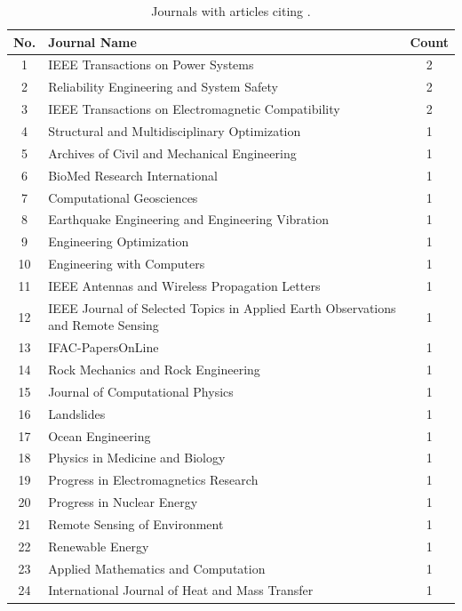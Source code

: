 \documentclass[11pt]{article}
\begin{document}
\begin{table}[!ht]
  \centering
  \caption{Journals with articles citing \uqlab.}
  \label{tab:citing_journals} 
  \begin{tabularx}{\textwidth}{cXc}\toprule
    \textbf{No.} & \textbf{Journal Name} & \textbf{Count} \\\midrule
1 & IEEE Transactions on Power Systems & 2\\
2 & Reliability Engineering and System Safety & 2\\
3 & IEEE Transactions on Electromagnetic Compatibility & 2\\
4 & Structural and Multidisciplinary Optimization & 1\\
5 & Archives of Civil and Mechanical Engineering & 1\\
6 & BioMed Research International & 1\\
7 & Computational Geosciences & 1\\
8 & Earthquake Engineering and Engineering Vibration & 1\\
9 & Engineering Optimization & 1\\
10 & Engineering with Computers & 1\\
11 & IEEE Antennas and Wireless Propagation Letters & 1\\
12 & IEEE Journal of Selected Topics in Applied Earth Observations and Remote Sensing & 1\\
13 & IFAC-PapersOnLine & 1\\
14 & Rock Mechanics and Rock Engineering & 1\\
15 & Journal of Computational Physics & 1\\
16 & Landslides & 1\\
17 & Ocean Engineering & 1\\
18 & Physics in Medicine and Biology & 1\\
19 & Progress in Electromagnetics Research & 1\\
20 & Progress in Nuclear Energy & 1\\
21 & Remote Sensing of Environment & 1\\
22 & Renewable Energy & 1\\
23 & Applied Mathematics and Computation & 1\\
24 & International Journal of Heat and Mass Transfer & 1\\\bottomrule
  \end{tabularx}
\end{table}
\end{document}
